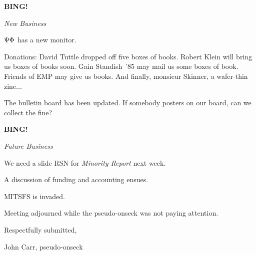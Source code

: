 \documentclass[12pt]{article}
\newcommand{\bing}{{\bf BING!} }
\newcommand{\goto}[1]{\bing \vskip 12pt \centerline{{\em{#1}}}}
\begin{document}
\goto{New Business}

$\rm \Psi\Phi$ has a new monitor.

Donations: David Tuttle dropped off five boxes of books.  Robert Klein
will bring us boxes of books soon.  Gain Standish~'85 may mail us some
boxes of book.  Friends of EMP may give us books.  And finally, monsieur
Skinner, a wafer-thin zine...

The bulletin board has been updated.  If somebody posters on our
board, can we collect the fine?

\vspace{12pt}

\goto{Future Business}

We need a slide RSN for {\em Minority Report} next week.

A discussion of funding and accounting ensues.

MITSFS is invaded.

\vspace{12pt}

\noindent
Meeting adjourned while the pseudo-onseck was not paying attention.

\vspace{18pt}

\centerline{Respectfully submitted,}
\centerline{John Carr, pseudo-onseck}
\end{document}
